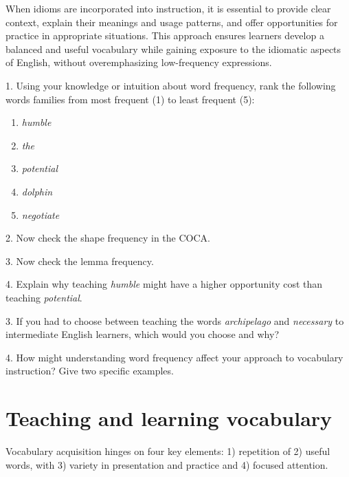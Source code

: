 When idioms are incorporated into instruction, it is essential to provide clear context, explain their meanings and usage patterns, and offer opportunities for practice in appropriate situations. This approach ensures learners develop a balanced and useful vocabulary while gaining exposure to the idiomatic aspects of English, without overemphasizing low-frequency expressions.

\begin{tcolorbox}[title=Exercise: Word Frequency and Vocabulary Selection, colback=white, colframe=red!75!black, fonttitle=\bfseries]
1. Using your knowledge or intuition about word frequency, rank the following words families from most frequent (1) to least frequent (5):

\begin{enumerate}[nosep]
    \item \textit{humble}
    \item \textit{the}
    \item \textit{potential}
    \item \textit{dolphin}
    \item \textit{negotiate}
\end{enumerate}

2. Now check the shape frequency in the COCA.

3. Now check the lemma frequency.

4. Explain why teaching \textit{humble} might have a higher opportunity cost than teaching \textit{potential}.

3. If you had to choose between teaching the words \textit{archipelago} and \textit{necessary} to intermediate English learners, which would you choose and why?

4. How might understanding word frequency affect your approach to vocabulary instruction? Give two specific examples.
\end{tcolorbox}

\section{Teaching and learning vocabulary} \label{sec:teaching-learning-vocab}
Vocabulary acquisition hinges on four key elements: 1) repetition of 2) useful words, with 3) variety in presentation and practice and 4) focused attention.

